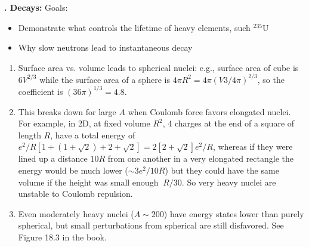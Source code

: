 \documentclass[11pt]{book}
\newcommand\bei{\begin{itemize}}
\newcommand\eei{\end{itemize}}
\newcommand\bee{\begin{enumerate}}
\newcommand\eee{\end{enumerate}}
\newcommand\lecture[1]{\newpage
\addtocounter{lectureno}{1}
\setcounter{secno}{0}
\begin{center}
 {\bf Lecture \arabic{lectureno}: #1}
\end{center}
}
\newcounter{lectureno}
\newcounter{secno}
\newcommand\lsection[1]{
\addtocounter{secno}{1}
{\bf \arabic{lectureno}.\alph{secno} #1:}}
\begin{document}
\lsection{Decays}
Goals:
\bei
\item Demonstrate what controls the lifetime of heavy elements, such $^{235}$U 
\item Why slow neutrons lead to instantaneous decay
\eei


\bee
\item Surface area vs. volume leads to spherical nuclei: e.g., surface area of cube is $6V^{2/3}$ while the surface area of a sphere is $4\pi R^2 = 4\pi (V3/4\pi)^{2/3}$, so the coefficient is $(36\pi)^{1/3}=4.8$.
\item This breaks down for large $A$ when Coulomb force favors elongated nuclei. For example, in 2D, at fixed volume $R^2$, 4 charges at the end of a square of length $R$, have a total energy of $e^2/R[1+(1+\sqrt{2}) + 2 +\sqrt{2}]=2[2+\sqrt{2}]e^2/R$, whereas if they were lined up a distance $10R$ from one another in a very elongated rectangle the energy would be much lower ($\sim 3e^2/10R$) but they could have the same volume if the height was small enough $~R/30$. So very heavy nuclei are unstable to Coulomb repulsion. 
\item Even moderately heavy nuclei ($A\sim 200$) have energy states lower than purely spherical, but small perturbations from spherical are still disfavored. See Figure 18.3 in the book.
\eee
\end{document}
